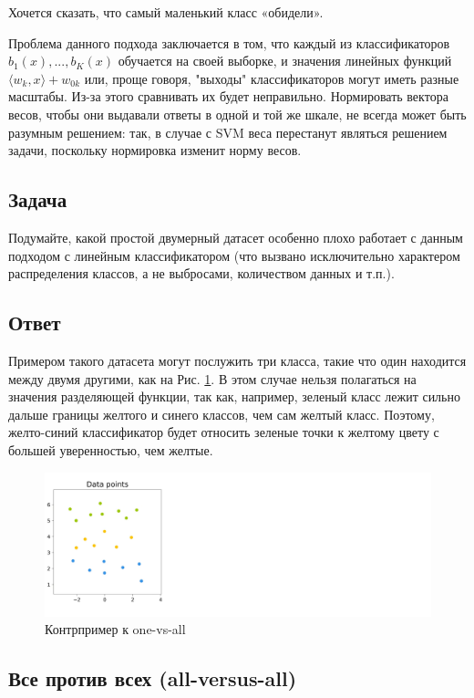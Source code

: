 Хочется сказать, что самый маленький класс «обидели».

Проблема данного подхода заключается в том, что каждый из классификаторов $b_1(x),...,b_K(x)$ обучается на своей выборке, и значения линейных функций $\langle w_k, x \rangle+w_{0k}$ или, проще говоря, "выходы" классификаторов могут иметь разные масштабы. Из-за этого сравнивать их будет неправильно. Нормировать вектора весов, чтобы они выдавали ответы в одной и той же шкале, не всегда может быть разумным решением: так, в случае с SVM веса перестанут являться решением задачи, поскольку нормировка изменит норму весов.

\subsection*{Задача}

Подумайте, какой простой двумерный датасет особенно плохо работает с данным подходом с линейным классификатором (что вызвано исключительно характером распределения классов, а не выбросами, количеством данных и т.п.). 

\subsection*{Ответ}

Примером такого датасета могут послужить три класса, такие что один находится между двумя другими, как на Рис. \ref{fig:linear-multi-ova-contrprimer}. В этом случае нельзя полагаться на значения разделяющей функции, так как, например, зеленый класс лежит сильно дальше границы желтого и синего классов, чем сам желтый класс. Поэтому, желто-синий классификатор будет относить зеленые точки к желтому цвету с большей уверенностью, чем желтые.

\begin{figure}[H]
	\centering
	\includegraphics[width=0.8\linewidth]{chapters/linear/pics/multi-ova-contrprimer.png}
	\caption{Контрпример к one-vs-all}
	\label{fig:linear-multi-ova-contrprimer}
\end{figure}

\subsection{Все против всех (all-versus-all)}

